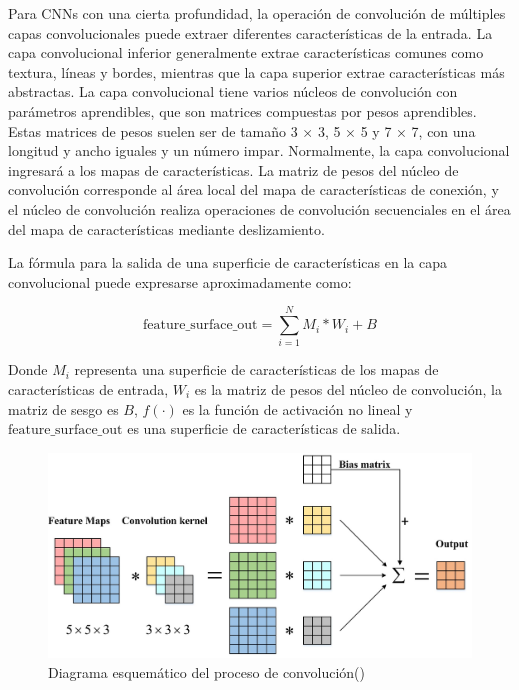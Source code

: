 Para CNNs con una cierta profundidad, la operación de convolución de múltiples capas convolucionales puede extraer diferentes características de la entrada. La capa convolucional inferior generalmente extrae características comunes como textura, líneas y bordes, mientras que la capa superior extrae características más abstractas. La capa convolucional tiene varios núcleos de convolución con parámetros aprendibles, que son matrices compuestas por pesos aprendibles. Estas matrices de pesos suelen ser de tamaño 3 × 3, 5 × 5 y 7 × 7, con una longitud y ancho iguales y un número impar. Normalmente, la capa convolucional ingresará a los mapas de características. La matriz de pesos del núcleo de convolución corresponde al área local del mapa de características de conexión, y el núcleo de convolución realiza operaciones de convolución secuenciales en el área del mapa de características mediante deslizamiento. 

La fórmula para la salida de una superficie de características en la capa convolucional puede expresarse aproximadamente como:

\[ \text{{feature\_surface\_out}} = \sum_{i=1}^{N} M_i * W_i + B \]

Donde \( M_i \) representa una superficie de características de los mapas de características de entrada, \( W_i \) es la matriz de pesos del núcleo de convolución, la matriz de sesgo es \( B \), \( f(\cdot) \) es la función de activación no lineal y \( \text{{feature\_surface\_out}} \) es una superficie de características de salida.


\begin{figure}[H]
	\begin{center}
		\includegraphics[width=1\textwidth]{2/figures/cnn1.jpeg}
		\caption{Diagrama esquemático del proceso de convolución(\cite{tecnica2})}
	\end{center}
\end{figure}

